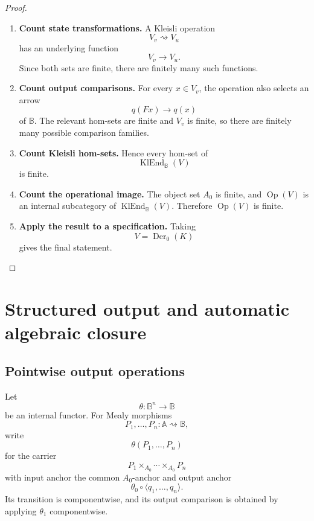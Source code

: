 \begin{proof}
    \leavevmode
    \begin{enumerate}
        \item \textbf{Count state transformations.}
        A Kleisli operation
        \[
            V_v\rightsquigarrow V_u
        \]
        has an underlying function
        \[
            V_v\to V_u.
        \]
        Since both sets are finite, there are finitely many such functions.

        \item \textbf{Count output comparisons.}
        For every \(x\in V_v\), the operation also selects an arrow
        \[
            q(Fx)\to q(x)
        \]
        of \(\mathbb B\). The relevant hom-sets are finite and \(V_v\) is
        finite, so there are finitely many possible comparison families.

        \item \textbf{Count Kleisli hom-sets.}
        Hence every hom-set of
        \[
            \operatorname{KlEnd}_{\mathbb B}(V)
        \]
        is finite.

        \item \textbf{Count the operational image.}
        The object set \(A_0\) is finite, and
        \(\operatorname{Op}(V)\) is an internal subcategory of
        \(\operatorname{KlEnd}_{\mathbb B}(V)\). Therefore
        \(\operatorname{Op}(V)\) is finite.

        \item \textbf{Apply the result to a specification.}
        Taking
        \[
            V=\operatorname{Der}_0(K)
        \]
        gives the final statement.
    \end{enumerate}
\end{proof}

\section{Structured output and automatic algebraic closure}
\label{sec:to-structured-output}

\subsection{Pointwise output operations}
\label{subsec:to-pointwise-output-operations}

Let
\[
    \theta:\mathbb B^n\to\mathbb B
\]
be an internal functor. For Mealy morphisms
\[
    P_1,\dots,P_n:
    \mathbb A\rightsquigarrow\mathbb B,
\]
write
\[
    \theta(P_1,\dots,P_n)
\]
for the carrier
\[
    P_1\times_{A_0}\cdots\times_{A_0}P_n
\]
with input anchor the common \(A_0\)-anchor and output anchor
\[
    \theta_0\circ
    \langle q_1,\dots,q_n\rangle.
\]
Its transition is componentwise, and its output comparison is obtained by
applying \(\theta_1\) componentwise.

